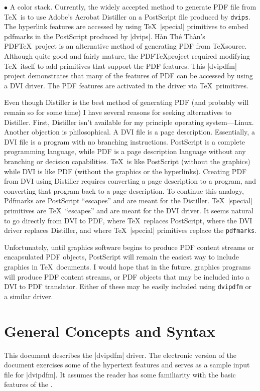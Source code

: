 \item{$\bullet$} A color stack.
\endlist
Currently, the widely accepted method to generate PDF file from \TeX\
is to use Adobe's Acrobat Distiller on a PostScript
file produced by {\tt dvips}.
The hyperlink features are accessed by using \TeX\ |special| primitives
to embed pdfmarks in the PostScript produced by |dvips|.
H\`an Th\'e Th\`an's PDF\TeX\ project is an alternative method
of generating PDF from \TeX source.
Although quite good and fairly mature, the PDF\TeX project
required modifying \TeX\ itself to add primitives that support the PDF features.
This |dvipdfm| project demonstrates that many of the features
of PDF can be accessed by using a DVI driver.
The PDF features are activated in the driver via \TeX\ \ttspecial primitives.

Even though Distiller is the best method of generating PDF (and
probably will remain so for some time) I have several reasons for
seeking alternatives to Distiller.
First, Distiller isn't available for my principle operating
system---Linux. Another objection is philosophical.
A DVI file is a page description.
Essentially, a DVI file is a program with no branching instructions.
PostScript is a complete programming language, while PDF is a page description language
without any branching or decision capabilities.
\TeX\ is like PostScript (without the graphics)
while DVI is like PDF (without the graphics or the hyperlinks).
Creating PDF from DVI using Distiller requires converting a page description to a program,
and converting that program back to a page description.
To continue this analogy,
Pdfmarks are PostScript ``escapes'' and are meant for the Distiller.
\TeX\ |special| primitives are \TeX\ ``escapes'' and are meant for the DVI driver.
It seems natural to go directly from DVI to PDF, where \TeX\ replaces
PostScript, where the DVI driver replaces Distiller,
and where \TeX\ |special| primitives replace the {\tt pdfmarks}.

Unfortunately, until graphics software
begins to produce PDF content streams or encapsulated
PDF objects, PostScript will remain the easiest
way to include graphics in \TeX\ documents.
I would hope that in the future, graphics programs
will produce PDF content streams, or PDF objects that
may be included into a DVI to PDF translator.  Either
of these may be easily included using {\tt dvipdfm}
or a similar driver.

\section{General Concepts and Syntax}
This document describes the |dvipdfm| driver.
The electronic version of the document exercises
some of the hypertext features and serves as
a sample input file for |dvipdfm|.
It assumes the reader has some familiarity with the basic features
of the .


